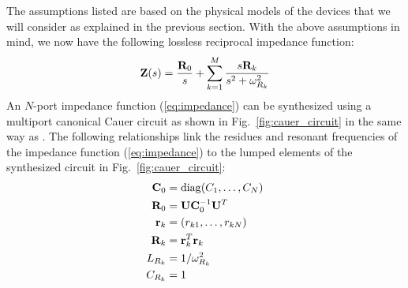 The assumptions listed are based on the physical models of the devices that we will consider as explained in the previous section. With the above assumptions in mind, we now have the following lossless reciprocal impedance function:
\begin{equation}\label{eq:impedance}
    \vb{Z}(s) = \frac{\vb{R}_0}{s} + \sum_{k=1}^M \frac{s \vb{R}_k}{s^2 + \omega_{R_k}^2}
\end{equation}
An $N$-port impedance function (\ref{eq:impedance}) can be synthesized using a multiport canonical Cauer circuit as shown in Fig.\ \ref{fig:cauer_circuit} in the same way as \cite{solgun_sirf}. The following relationships link the residues and resonant frequencies of the impedance function (\ref{eq:impedance}) to the lumped elements of the synthesized circuit in Fig.\ \ref{fig:cauer_circuit}:
\begin{align}
    \vb{C}_0 &= \operatorname{diag}(C_1, \dots, C_N) \\
    \vb{R}_0 &=  \vb{U} \vb{C}_0^{-1} \vb{U}^T \label{eq:DC_residue}\\
    \vb{r}_k &= (r_{k1}, \dots, r_{kN}) \label{eq:row_R}\\
    \vb{R}_k &= \vb{r}_k^T \vb{r}_k \\
    L_{R_k} &= 1/\omega_{R_k}^2 \\
    C_{R_k} &= 1 \label{eq:C_R}
\end{align}

